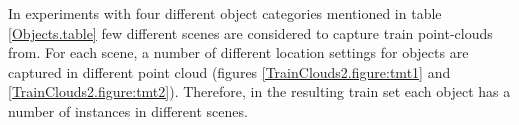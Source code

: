 In experiments with four different object categories mentioned in table \ref{Objects.table} few different scenes are considered to capture train point-clouds from.
For each scene, a number of different location settings for objects are captured in different point cloud (figures \ref{TrainClouds2.figure:tmt1} and \ref{TrainClouds2.figure:tmt2}).
Therefore, in the resulting train set each object has a number of instances in different scenes.

\begin{figure} [htp]
   \begin{center}
     \\

\end{center}
\end{figure}
